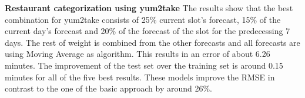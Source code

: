 \begin{table}[h]
\centering
\caption{Combination of categorizations results for all orders}
\label{Combination of Categorizations results for all orders}
\end{table}
\newline\newline\textbf{Restaurant categorization using yum2take}\newline
The results show that the best combination for yum2take consists of 25\% current slot's forecast, 15\% of the current day's forecast and 20\% of the forecast of the slot for the predecessing 7 days. The rest of weight is combined from the other forecasts and all forecasts are using Moving Average as algorithm. This results in an error of about 6.26 minutes. The improvement of the test set over the training set is around 0.15 minutes for all of the five best results.\newline
These models improve the RMSE in contrast to the one of the basic approach by around 26\%.
